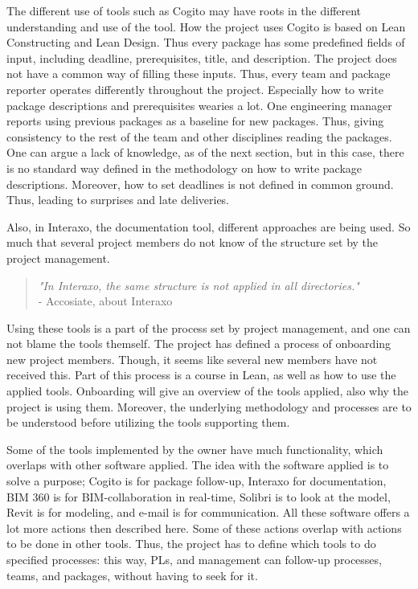 The different use of tools such as Cogito may have roots in the different understanding and use of the tool. How the project uses Cogito is based on Lean Constructing and Lean Design. Thus every package has some predefined fields of input, including deadline, prerequisites, title, and description. The project does not have a common way of filling these inputs. Thus, every team and package reporter operates differently throughout the project. Especially how to write package descriptions and prerequisites wearies a lot. 
One engineering manager reports using previous packages as a baseline for new packages. Thus, giving consistency to the rest of the team and other disciplines reading the packages. One can argue a lack of knowledge, as of the next section, but in this case, there is no standard way defined in the methodology on how to write package descriptions. Moreover, how to set deadlines is not defined in common ground. Thus, leading to surprises and late deliveries. 

Also, in Interaxo, the documentation tool, different approaches are being used. So much that several project members do not know of the structure set by the project management. 

\begin{quote}
    \textit{"In Interaxo, the same structure is not applied in all directories."}\\
    - Accosiate, about Interaxo
\end{quote}

Using these tools is a part of the process set by project management, and one can not blame the tools themself. The project has defined a process of onboarding new project members. Though, it seems like several new members have not received this. Part of this process is a course in Lean, as well as how to use the applied tools. Onboarding will give an overview of the tools applied, also why the project is using them. Moreover, the underlying methodology and processes are to be understood before utilizing the tools supporting them.  

Some of the tools implemented by the owner have much functionality, which overlaps with other software applied. The idea with the software applied is to solve a purpose; Cogito is for package follow-up, Interaxo for documentation, BIM 360 is for BIM-collaboration in real-time, Solibri is to look at the model, Revit is for modeling, and e-mail is for communication. All these software offers a lot more actions then described here. Some of these actions overlap with actions to be done in other tools. Thus, the project has to define which tools to do specified processes: this way, PLs, and management can follow-up processes, teams, and packages, without having to seek for it.

